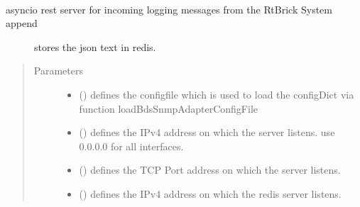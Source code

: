 \documentclass[letterpaper,10pt,english]{sphinxmanual}
\begin{document}
\begin{fulllineitems}
\label{\detokenize{modules:restServer.restHttpServer}}~\begin{description}
\item[{asyncio rest server for incoming logging messages from the RtBrick System append}] \leavevmode
stores the json text in redis.

\end{description}
\begin{quote}\begin{description}
\item[{Parameters}] \leavevmode\begin{itemize}
\item {} 
\sphinxstyleliteralstrong{\sphinxupquote{{[}}}\sphinxstyleliteralstrong{\sphinxupquote{{]}}} () \textendash{} defines the configfile which is used to load the configDict via function loadBdsSnmpAdapterConfigFile

\item {} 
\sphinxstyleliteralstrong{\sphinxupquote{{[}}}\sphinxstyleliteralstrong{\sphinxupquote{{]}}} () \textendash{} defines the IPv4 address on which the server listens. use 0.0.0.0 for all interfaces.

\item {} 
\sphinxstyleliteralstrong{\sphinxupquote{{[}}}\sphinxstyleliteralstrong{\sphinxupquote{{]}}} () \textendash{} defines the TCP Port address on which the server listens.

\item {} 
\sphinxstyleliteralstrong{\sphinxupquote{{[}}}\sphinxstyleliteralstrong{\sphinxupquote{{]}}} () \textendash{} defines the IPv4 address on which the redis server listens.


\end{itemize}
\end{description}
\end{quote}
\end{fulllineitems}
\end{document}
